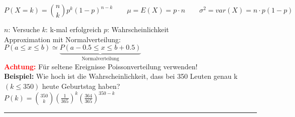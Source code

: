 $$P(X=k) = \binom n k p^k(1-p)^{n-k} \qquad \mu = E(X) = p \cdot n \qquad \sigma^2 =
var(X) = n \cdot p (1-p)$$

$n$: Versuche \hspace{10mm}
$k$: k-mal erfolgreich \hspace{10mm}
$p$: Wahrscheinlichkeit\\

Approximation mit Normalverteilung: $P(a \leq x \leq b) \simeq \underbrace{P(a-0.5 \leq x \leq b+0.5)}_{\text{Normalverteilung}}$\\[7pt]
\textbf{\textcolor{red}{Achtung:}} Für seltene Ereignisse Poissonverteilung verwenden!\\

{\bf Beispiel:} Wie hoch ist die Wahrscheinlichkeit, dass bei 350 Leuten genau
k $(k\leq 350)$ heute Geburtstag haben?\\
$P(k)=\binom {350} k \left(\frac{1}{365}\right)^k
\left(\frac{364}{365}\right)^{350-k}$ \\



\hrule
